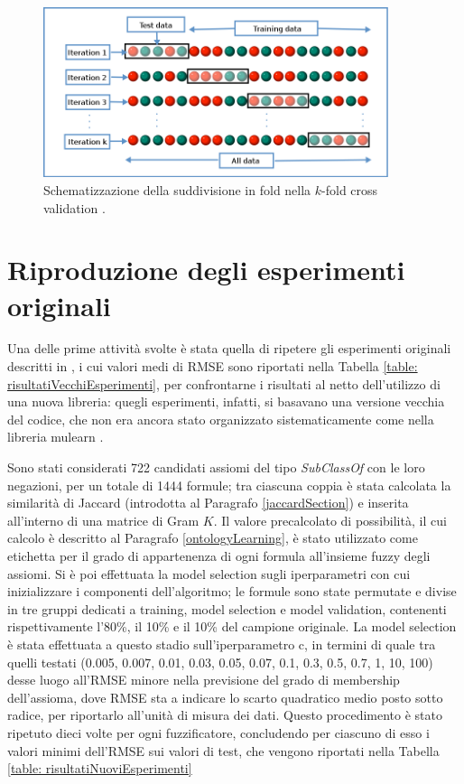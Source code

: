 \documentclass[12pt,a4paper]{report}
\begin{document}
\begin{figure}[h]	
\centering
\includegraphics[width=0.9\textwidth]{images/782px-K-fold_cross_validation_EN.svg.png}
\caption{Schematizzazione della suddivisione in fold nella $k$-fold cross validation \cite{crossValidationImage}.}
\label{scikitSchema}
\end{figure}

\section{Riproduzione degli esperimenti originali}
Una delle prime attività svolte è stata quella di ripetere gli esperimenti originali descritti in \cite{sacpaper}, i cui valori medi di RMSE sono riportati nella Tabella \ref{table: risultatiVecchiEsperimenti}, per confrontarne i risultati al netto dell'utilizzo di una nuova libreria: quegli esperimenti, infatti, si basavano una versione vecchia del codice, che non era ancora stato organizzato sistematicamente come nella libreria mulearn \cite{mulearn}.

Sono stati considerati 722 candidati assiomi del tipo \emph{SubClassOf} con le loro negazioni, per un totale di 1444 formule;  tra ciascuna coppia è stata calcolata la similarità di Jaccard (introdotta al Paragrafo \ref{jaccardSection}) e inserita all'interno di una matrice di Gram $K$.
Il valore precalcolato di possibilità, il cui calcolo è descritto al Paragrafo \ref{ontologyLearning}, è stato utilizzato come etichetta per il grado di appartenenza di ogni formula all'insieme fuzzy degli assiomi.
Si è poi effettuata la model selection sugli iperparametri con cui inizializzare i componenti dell'algoritmo; le formule sono state permutate e divise in tre gruppi dedicati a training, model selection e model validation, contenenti rispettivamente l'80\%, il 10\% e il 10\% del campione originale.
La model selection è stata effettuata a questo stadio sull'iperparametro c, in termini di quale tra quelli testati (0.005, 0.007, 0.01, 0.03, 0.05, 0.07, 0.1, 0.3, 0.5, 0.7, 1, 10, 100) desse luogo all'RMSE minore nella previsione del grado di membership dell'assioma, dove RMSE sta a indicare lo scarto quadratico medio posto sotto radice, per riportarlo all'unità di misura dei dati.
Questo procedimento è stato ripetuto dieci volte per ogni fuzzificatore, concludendo per ciascuno di esso i valori minimi dell'RMSE sui valori di test, che vengono riportati nella Tabella \ref{table: risultatiNuoviEsperimenti}
\end{document}
